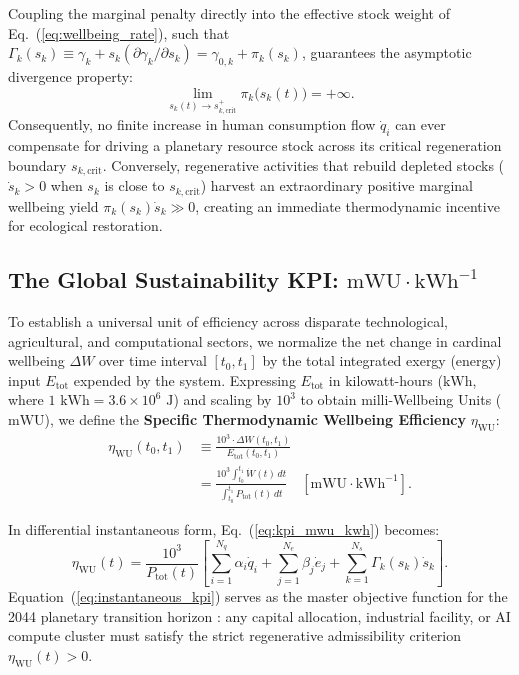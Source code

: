 \documentclass[aps,pre,twocolumn,10pt,superscriptaddress,amsmath,amssymb,amsfonts,floatfix,showkeys]{revtex4-2}
\begin{document}
Coupling the marginal penalty directly into the effective stock weight of Eq.~(\ref{eq:wellbeing_rate}), such that $\Gamma_k(s_k) \equiv \gamma_k + s_k(\partial\gamma_k/\partial s_k) = \gamma_{0,k} + \pi_k(s_k)$, guarantees the asymptotic divergence property:
\begin{equation}
    \lim_{s_k(t) \to s_{k,\text{crit}}^{+}} \pi_k\big(s_k(t)\big) = +\infty.
    \label{eq:divergence_limit}
\end{equation}
Consequently, no finite increase in human consumption flow $\dot{q}_i$ can ever compensate for driving a planetary resource stock across its critical regeneration boundary $s_{k,\text{crit}}$. Conversely, regenerative activities that rebuild depleted stocks ($\dot{s}_k > 0$ when $s_k$ is close to $s_{k,\text{crit}}$) harvest an extraordinary positive marginal wellbeing yield $\pi_k(s_k)\dot{s}_k \gg 0$, creating an immediate thermodynamic incentive for ecological restoration.

\subsection{The Global Sustainability KPI: \texorpdfstring{$\text{mWU}\cdot\text{kWh}^{-1}$}{mWU/kWh}}

To establish a universal unit of efficiency across disparate technological, agricultural, and computational sectors, we normalize the net change in cardinal wellbeing $\Delta W$ over time interval $[t_0, t_1]$ by the total integrated exergy (energy) input $E_{\text{tot}}$ expended by the system. Expressing $E_{\text{tot}}$ in kilowatt-hours ($\text{kWh}$, where $1\text{ kWh} = 3.6 \times 10^6\text{ J}$) and scaling by $10^3$ to obtain milli-Wellbeing Units ($\text{mWU}$), we define the \textbf{Specific Thermodynamic Wellbeing Efficiency} $\eta_{\text{WU}}$:
\begin{equation}
\begin{aligned}
    \eta_{\text{WU}}(t_0, t_1) &\equiv \frac{10^3 \cdot \Delta W(t_0, t_1)}{E_{\text{tot}}(t_0, t_1)} \\
    &= \frac{10^3 \int_{t_0}^{t_1} \dot{W}(t)\,dt}{\int_{t_0}^{t_1} P_{\text{tot}}(t)\,dt} \quad \left[\text{mWU}\cdot\text{kWh}^{-1}\right].
\end{aligned}
\label{eq:kpi_mwu_kwh}
\end{equation}

In differential instantaneous form, Eq.~(\ref{eq:kpi_mwu_kwh}) becomes:
\begin{equation}
    \eta_{\text{WU}}(t) = \frac{10^3}{P_{\text{tot}}(t)} \left[ \sum_{i=1}^{N_q} \alpha_i \dot{q}_i + \sum_{j=1}^{N_e} \beta_j \dot{e}_j + \sum_{k=1}^{N_s} \Gamma_k(s_k) \dot{s}_k \right].
    \label{eq:instantaneous_kpi}
\end{equation}
Equation~(\ref{eq:instantaneous_kpi}) serves as the master objective function for the 2044 planetary transition horizon \cite{RanaoraSunStandard}: any capital allocation, industrial facility, or AI compute cluster must satisfy the strict regenerative admissibility criterion $\eta_{\text{WU}}(t) > 0$.
\end{document}
